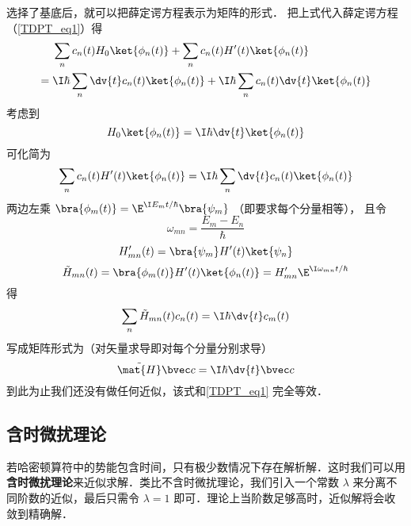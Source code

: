 选择了基底后，就可以把薛定谔方程表示为矩阵的形式． %
把上式代入薛定谔方程（\autoref{TDPT_eq1}）得
\begin{equation}
\begin{aligned}
&\sum_n c_n(t) H_0 \ket{\phi_n(t)} + \sum_n c_n(t) H'(t) \ket{\phi_n(t)} \\ 
={} &\I\hbar \sum_n \dv{t} c_n(t) \ket{\phi_n(t)}
+ \I\hbar \sum_n c_n(t) \dv{t} \ket{\phi_n(t)}
\end{aligned}
\end{equation}
考虑到
\begin{equation}
H_0\ket{\phi_n(t)} = \I\hbar \dv{t} \ket{\phi_n(t)}
\end{equation}
可化简为
\begin{equation}
\sum_n c_n(t) H'(t) \ket{\phi_n(t)}
= \I\hbar \sum_n \dv{t} c_n(t) \ket{\phi_n(t)}
\end{equation}
两边左乘 $\bra{\phi_m(t)} = \E^{\I E_m t/\hbar}\bra{\psi_m}$ （即要求每个分量相等）， 且令
\begin{equation}
\omega_{mn} = \frac{E_m-E_n}{\hbar}
\end{equation}
\begin{equation}
H'_{mn}(t) = \bra{\psi_m} H'(t)\ket{\psi_n}
\end{equation}
\begin{equation}\label{TDPT_eq7}
\tilde H_{mn}(t) = \bra{\phi_m(t)} H'(t) \ket{\phi_n(t)} = H'_{mn} \E^{\I\omega_{mn}t/\hbar}
\end{equation}
得
\begin{equation}\label{TDPT_eq2}
\sum_n \tilde H_{mn}(t) c_n(t)
= \I\hbar \dv{t} c_m(t)
\end{equation}
写成矩阵形式为（对矢量求导即对每个分量分别求导）
\begin{equation}\label{TDPT_eq3}
\tilde{\mat {H}} \bvec c = \I\hbar \dv{t} \bvec c
\end{equation}
到此为止我们还没有做任何近似，该式和\autoref{TDPT_eq1} 完全等效．

\subsection{含时微扰理论}
若哈密顿算符中的势能包含时间，只有极少数情况下存在解析解．这时我们可以用\textbf{含时微扰理论}来近似求解．类比不含时微扰理论，我们引入一个常数 $\lambda$ 来分离不同阶数的近似，最后只需令 $\lambda = 1$ 即可．理论上当阶数足够高时，近似解将会收敛到精确解．%

